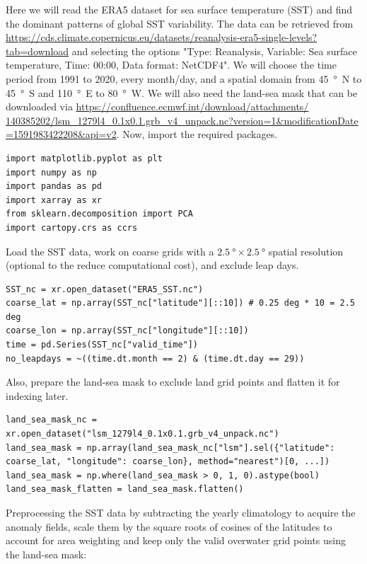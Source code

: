 Here we will read the ERA5 dataset for sea surface temperature (SST) and find the dominant patterns of global SST variability. The data can be retrieved from \href{https://cds.climate.copernicus.eu/datasets/reanalysis-era5-single-levels?tab=download}{https://cds.climate.copernicus.eu/datasets/reanalysis-era5-single-levels?tab=download} and selecting the options "Type: Reanalysis, Variable: Sea surface temperature, Time: 00:00, Data format: NetCDF4". We will choose the time period from 1991 to 2020, every month/day, and a spatial domain from \SI{45}{\degree N} to \SI{45}{\degree S} and \SI{110}{\degree E} to \SI{80}{\degree W}. We will also need the land-sea mask that can be downloaded via \href{https://confluence.ecmwf.int/download/attachments/140385202/lsm_1279l4_0.1x0.1.grb_v4_unpack.nc?version=1&modificationDate=1591983422208&api=v2}{https://confluence.ecmwf.int/download/attachments/\\140385202/lsm\_1279l4\_0.1x0.1.grb\_v4\_unpack.nc?version=1\&modificationDate\\=1591983422208\&api=v2}. Now, import the required packages.
\begin{lstlisting}
import matplotlib.pyplot as plt
import numpy as np
import pandas as pd
import xarray as xr
from sklearn.decomposition import PCA
import cartopy.crs as ccrs
\end{lstlisting}
Load the SST data, work on coarse grids with a $\SI{2.5}{\degree} \times \SI{2.5}{\degree}$ spatial resolution (optional to the reduce computational cost), and exclude leap days.
\begin{lstlisting}
SST_nc = xr.open_dataset("ERA5_SST.nc")
coarse_lat = np.array(SST_nc["latitude"][::10]) # 0.25 deg * 10 = 2.5 deg
coarse_lon = np.array(SST_nc["longitude"][::10])
time = pd.Series(SST_nc["valid_time"])
no_leapdays = ~((time.dt.month == 2) & (time.dt.day == 29))
\end{lstlisting}
Also, prepare the land-sea mask to exclude land grid points and flatten it for indexing later.
\begin{lstlisting}
land_sea_mask_nc = xr.open_dataset("lsm_1279l4_0.1x0.1.grb_v4_unpack.nc")
land_sea_mask = np.array(land_sea_mask_nc["lsm"].sel({"latitude": coarse_lat, "longitude": coarse_lon}, method="nearest")[0, ...])
land_sea_mask = np.where(land_sea_mask > 0, 1, 0).astype(bool)
land_sea_mask_flatten = land_sea_mask.flatten()
\end{lstlisting}
Preprocessing the SST data by subtracting the yearly climatology to acquire the anomaly fields, scale them by the square roots of cosines of the latitudes to account for area weighting and keep only the valid overwater grid points using the land-sea mask:

